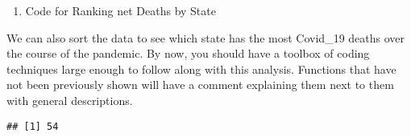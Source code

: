 \documentclass[
]{article}
\newenvironment{Shaded}{\begin{snugshade}}{\end{snugshade}}
\newcommand{\CommentTok}[1]{\textcolor[rgb]{0.56,0.35,0.01}{\textit{#1}}}
\newcommand{\FunctionTok}[1]{\textcolor[rgb]{0.00,0.00,0.00}{#1}}
\newcommand{\NormalTok}[1]{#1}
\newcommand{\OtherTok}[1]{\textcolor[rgb]{0.56,0.35,0.01}{#1}}
\newcommand{\SpecialCharTok}[1]{\textcolor[rgb]{0.00,0.00,0.00}{#1}}
\providecommand{\tightlist}{%
  \setlength{\itemsep}{0pt}\setlength{\parskip}{0pt}}
\begin{document}
\begin{enumerate}
\def\labelenumi{\arabic{enumi}.}
\setcounter{enumi}{2}
\tightlist
\item
  Code for Ranking net Deaths by State
\end{enumerate}

We can also sort the data to see which state has the most Covid\_19
deaths over the course of the pandemic. By now, you should have a
toolbox of coding techniques large enough to follow along with this
analysis. Functions that have not been previously shown will have a
comment explaining them next to them with general descriptions.

\begin{Shaded}
\end{Shaded}

\begin{verbatim}
## [1] 54
\end{verbatim}

\begin{Shaded}
\end{Shaded}
\end{document}
